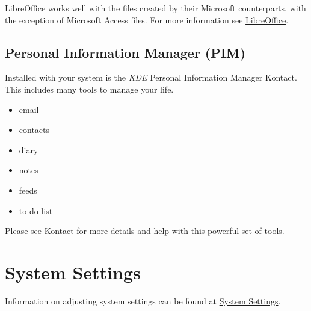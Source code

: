 \documentclass[letterpaper,10pt,english]{sphinxmanual}
\begin{document}
LibreOffice works well with the files created by their Microsoft counterparts, with the exception of Microsoft Access files. For more information see \href{https://wiki.ubuntu.com/LibreOffice}{LibreOffice}.


\subsection{Personal Information Manager (PIM)}
\label{docs/software:personal-information-manager-pim}
Installed with your system is the \emph{KDE} Personal Information Manager Kontact. This includes many tools to manage your life.
\begin{itemize}
\item {} 
email

\item {} 
contacts

\item {} 
diary

\item {} 
notes

\item {} 
feeds

\item {} 
to-do list

\end{itemize}

Please see \href{https://userbase.kde.org/Special:MyLanguage/Kontact}{Kontact} for more details and help with this powerful set of tools.


\section{System Settings}
\label{docs/software:system-settings}
Information on adjusting system settings can be found at \href{https://userbase.kde.org/Special:MyLanguage/System\_Settings}{System Settings}.
\end{document}
